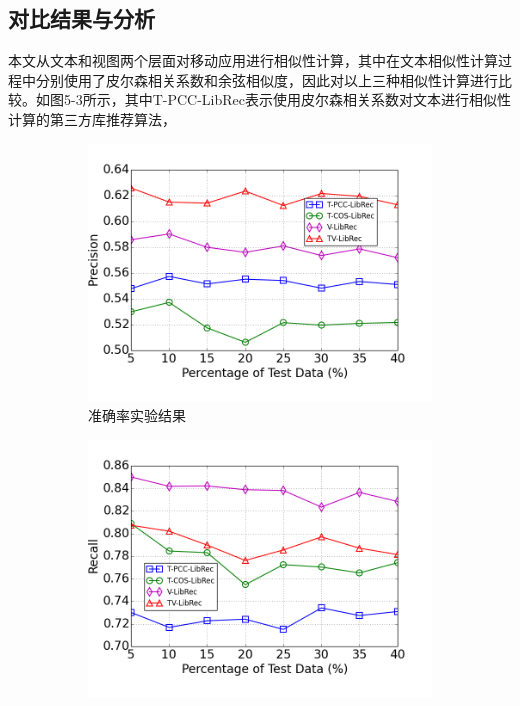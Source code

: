 \subsection{对比结果与分析}
本文从文本和视图两个层面对移动应用进行相似性计算，其中在文本相似性计算过程中分别使用了皮尔森相关系数和余弦相似度，因此对以上三种相似性计算进行比较。如图5-3所示，其中T-PCC-LibRec表示使用皮尔森相关系数对文本进行相似性计算的第三方库推荐算法，
\begin{figure}
	\centering
	\begin{subfigure}[b]{0.495\textwidth}
		\includegraphics[width=\textwidth]{figures/feature_comp_p}
		\caption{准确率实验结果}
	\end{subfigure}
	\begin{subfigure}[b]{0.495\textwidth}
		\includegraphics[width=\textwidth]{figures/feature_comp_r}

\end{subfigure}
\end{figure}
